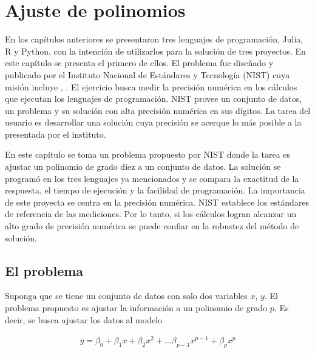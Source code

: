 \chapter{Ajuste de polinomios} \label{cap_polinomios}

En los capítulos anteriores se presentaron tres lenguajes de programación, \textsf{Julia, R } y \textsf{Python}, con la intención de utilizarlos para la solución de tres proyectos. En este capítulo se presenta el primero de ellos. El problema fue diseñado y publicado por el Instituto Nacional de Estándares y Tecnología (NIST) cuya misión incluye , \cite{NIST_pagina}. El ejercicio busca medir la precisión numérica en los cálculos que ejecutan los lenguajes de programación. NIST provee un conjunto de datos, un problema y su solución con alta precisión numérica en sus dígitos. La tarea del usuario es desarrollar una solución cuya precisión se acerque lo más posible a la presentada por el instituto. 

En este capítulo se toma un problema propuesto por NIST donde la tarea es ajustar un polinomio de grado diez a un conjunto de datos. La solución se programó en los tres lenguajes ya mencionados y se compara la exactitud de la respuesta, el tiempo de ejecución y la facilidad de programación. La importancia de este proyecta se centra en la precisión numérica. NIST establece los estándares de referencia de las mediciones. Por lo tanto, si los cálculos logran alcanzar un alto grado de precisión numérica se puede confiar en la robustez del método de solución. 


\section{El problema}
Suponga que se tiene un conjunto de datos con solo dos variables $x$, $y$. El problema propuesto es ajustar la información a un polinomio de grado $p$. Es decir, se busca ajustar los datos al modelo

\begin{equation} \label{eq_matricial_pol}
    \begin{aligned}
    y = \beta_0 + \beta_1 x + \beta_2 x^{2} + \dots \beta_{p-1} x^{p-1} + \beta_p x^{p}
    \end{aligned}
\end{equation}

